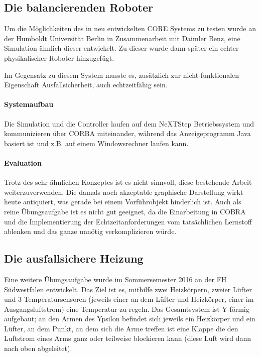 \documentclass[
    12pt,
    bibliography=totoc,
    ngerman,
    enabledeprecatedfontcommands
]{scrartcl}
\begin{document}
\subsection{Die balancierenden Roboter}
Um die M{\"{o}}glichkeiten des in \cite{Werner00} neu entwickelten CORE Systems zu testen wurde an der Humboldt Universit{\"{a}}t Berlin in Zusammenarbeit
mit Daimler Benz, eine Simulation {\"{a}}hnlich dieser entwickelt. Zu dieser wurde dann sp{\"{a}}ter ein echter physikalischer Roboter hinzugef{\"{u}}gt.

Im Gegensatz zu diesem System musste es, zus{\"{a}}tzlich zur nicht-funktionalen Eigenschaft Ausfallsicherheit, auch echtzeitf{\"{a}}hig sein.

\paragraph{Systemaufbau} Die Simulation und die Controller laufen auf dem NeXTStep Betriebssystem und kommunizieren {\"{u}}ber CORBA miteinander\cite{predictablecorba}, w{\"{a}}hrend
das Anzeigeprogramm Java basiert ist und z.B. auf einem Windowsrechner laufen kann.


\paragraph{Evaluation} Trotz des sehr {\"{a}}hnlichen Konzeptes ist es nicht sinnvoll, diese bestehende Arbeit weiterzuverwenden.
Die damals noch akzeptable graphische Darstellung wirkt heute antiquiert, was gerade bei einem Vorf{\"{u}}hrobjekt hinderlich
ist. Auch als reine {\"{U}}bungsaufgabe ist es nicht gut geeignet, da die Einarbeitung in COBRA und die Implementierung der
Echtzeitanforderungen vom tats{\"{a}}chlichen Lernstoff ablenken und das ganze unn{\"{o}}tig verkomplizieren w{\"{u}}rde.

\subsection{Die ausfallsichere Heizung}
Eine weitere {\"{U}}bungsaufgabe wurde im Sommersemester 2016 an der FH S{\"{u}}dwestfalen entwickelt. Das Ziel ist es, mithilfe zwei Heizk{\"{o}}rpern, zweier
L{\"{u}}fter und 3 Temperatursensoren (jeweils einer an dem L{\"{u}}fter und Heizk{\"{o}}rper, einer im Ausgangsluftstrom) eine Temperatur zu regeln.
Das Gesamtsystem ist Y-f{\"{o}}rmig aufgebaut; an den Armen des Ypsilon befindet sich jeweils ein Heizk{\"{o}}rper und ein L{\"{u}}fter, an dem Punkt, an dem sich
die Arme treffen ist eine Klappe die den Luftstrom eines Arms ganz oder teilweise blockieren kann (diese Luft wird dann nach oben abgeleitet).
\end{document}
